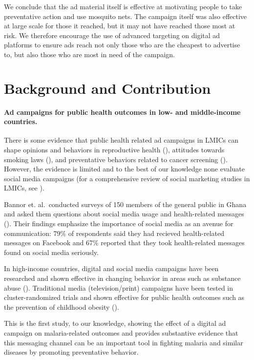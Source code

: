 \documentclass[a4paper,12pt]{article}
\begin{document}
We conclude that the ad material itself is effective at motivating people to take preventative action and use mosquito nets. The campaign itself was also effective at large scale for those it reached, but it may not have reached those most at risk. We therefore encourage the use of advanced targeting on digital ad platforms to ensure ads reach not only those who are the cheapest to advertise to, but also those who are most in need of the campaign.


\section{Background and Contribution}

\paragraph{Ad campaigns for public health outcomes in low- and middle-income countries.} There is some evidence that public health related ad campaigns in LMICs can shape opinions and behaviors in reproductive health (\cite{Agha2012}), attitudes towards smoking laws (\cite{Alday2010}), and preventative behaviors related to cancer screening (\cite{Wichachai2016}). However, the evidence is limited and to the best of our knowledge none evaluate social media campaigns (for a comprehensive review of social marketing studies in LMICs, see \cite{Schmidtke2021}).

Bannor et. al.\ conducted surveys of 150 members of the general public in Ghana and asked them questions about social media usage and health-related messages (\cite{Bannor2017}). Their findings emphasize the importance of social media as an avenue for communication: 79\% of respondents said they had recieved health-related messages on Facebook and 67\% reported that they took health-related messages found on social media seriously.

In high-income countries, digital and social media campaigns have been researched and shown effective in changing behavior in areas such as substance abuse (\cite{Evans2020}). Traditional media (television/print) campaigns have been tested in cluster-randomized trials and shown effective for public health outcomes such as the prevention of childhood obesity (\cite{Croker2012}).


This is the first study, to our knowledge, showing the effect of a digital ad campaign on malaria-related outcomes and provides substantive evidence that this messaging channel can be an important tool in fighting malaria and similar diseases by promoting preventative behavior.
\end{document}
